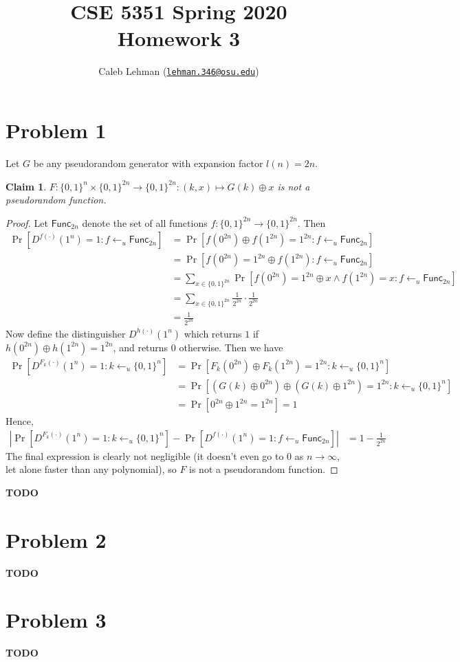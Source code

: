 \documentclass[12pt]{article}
\title{%
CSE 5351 Spring 2020\\
Homework 3
}
\author{%
Caleb Lehman
(\href{mailto:lehman.346@osu.edu}{\texttt{lehman.346@osu.edu}})
}
\date{%
}
\numberwithin{equation}{section}
\theoremstyle{plain}
\newtheorem{claim}{Claim}
\newcommand{\set}[1]{\{ #1 \}}
\DeclareMathOperator*{\prob}{Pr}
\newcommand{\func}{\algo{Func}}
\newcommand{\algo}[1]{\mathsf{#1}}
\newcommand{\param}{1}
\begin{document}
\maketitle

\section*{Problem 1}

Let $G$ be any pseudorandom generator with expansion factor $l(n) = 2n$.
\begin{claim}
$F: \set{ 0, 1 }^n \times \set{ 0, 1 }^{2n} \to \set{ 0, 1 }^{2n} : (k, x) \mapsto G(k) \oplus x$ is not a pseudorandom function.
\end{claim}
\begin{proof}
Let $\func_{2n}$ denote the set of all functions $f : \set{ 0, 1 }^{2n} \to \set{ 0, 1 }^{2n}$.
Then
\begin{align*}
    \prob[D^{f(\cdot)}(1^n) = 1 : f \gets_u \func_{2n}]
        &= \prob[f(0^{2n}) \oplus f(1^{2n}) = 1^{2n} : f \gets_u \func_{2n}]\\
        &= \prob[f(0^{2n}) = 1^{2n} \oplus f(1^{2n}) : f \gets_u \func_{2n}]\\
        &= \sum_{x \in \set{ 0, 1 }^{2n}} \prob[f(0^{2n}) = 1^{2n} \oplus x \land f(1^{2n}) = x : f \gets_u \func_{2n}]\\
        &= \sum_{x \in \set{ 0, 1 }^{2n}} \frac{1}{2^{2n}} \cdot \frac{1}{2^{2n}}\\
        &= \frac{1}{2^{2n}}
\end{align*}
Now define the distinguisher $D^{h(\cdot)}(\param^n)$
which returns $1$ if $h(0^{2n}) \oplus h(1^{2n}) = 1^{2n}$,
and returns $0$ otherwise.
Then we have
\begin{align*}
    \prob[D^{F_k(\cdot)}(1^n) = 1 : k \gets_u \set{ 0, 1 }^n]
        &= \prob[F_k(0^{2n}) \oplus F_k(1^{2n}) = 1^{2n} : k \gets_u \set{ 0, 1 }^n]\\
        &= \prob[\left(G(k) \oplus 0^{2n}\right) \oplus \left(G(k) \oplus 1^{2n}\right) = 1^{2n} : k \gets_u \set{ 0, 1 }^n]\\
        &= \prob[0^{2n} \oplus 1^{2n} = 1^{2n}] = 1
\end{align*}
Hence,
\begin{align*}
    |\prob[D^{F_k(\cdot)}(1^n) = 1 : k \gets_u \set{ 0, 1 }^n] - \prob[D^{f(\cdot)}(1^n) = 1 : f \gets_u \func_{2n}]|
        &= 1 - \frac{1}{2^{2n}}
\end{align*}
The final expression is clearly not negligible (it doesn't even go to $0$ as $n \to \infty$, let alone faster than any polynomial),
so $F$ is not a pseudorandom function.
\end{proof}

\textbf{TODO}

\section*{Problem 2}

\textbf{TODO}

\section*{Problem 3}

\textbf{TODO}
\end{document}
